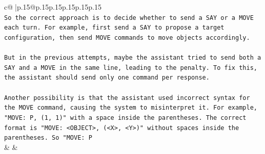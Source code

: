 \documentclass{article}
\begin{document}
{\begin{supertabular}{c@{$\;$}|p{.15\linewidth}@{}p{.15\linewidth}p{.15\linewidth}p{.15\linewidth}p{.15\linewidth}p{.15\linewidth}}
{{{\\ 
\texttt{So the correct approach is to decide whether to send a SAY or a MOVE each turn. For example, first send a SAY to propose a target configuration, then send MOVE commands to move objects accordingly.} \\
\\ 
\texttt{But in the previous attempts, maybe the assistant tried to send both a SAY and a MOVE in the same line, leading to the penalty. To fix this, the assistant should send only one command per response.} \\
\\ 
\texttt{Another possibility is that the assistant used incorrect syntax for the MOVE command, causing the system to misinterpret it. For example, "MOVE: P, (1, 1)" with a space inside the parentheses. The correct format is "MOVE: <OBJECT>, (<X>, <Y>)" without spaces inside the parentheses. So "MOVE: P} \\
            }
        }
    }
    & & \\ \\


\end{supertabular}}
\end{document}
